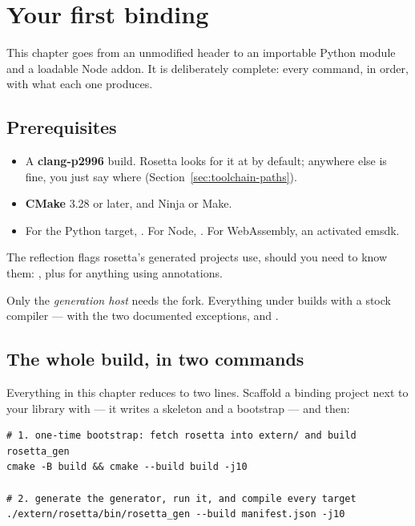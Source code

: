 \chapter{Your first binding}
\label{ch:first}

This chapter goes from an unmodified header to an importable Python module and
a loadable Node addon. It is deliberately complete: every command, in order,
with what each one produces.

\section{Prerequisites}

\begin{itemize}
  \item A \textbf{clang-p2996} build. Rosetta looks for it at
     by default; anywhere else
    is fine, you just say where (Section~\ref{sec:toolchain-paths}).
  \item \textbf{CMake} 3.28 or later, and Ninja or Make.
  \item For the Python target, . For Node,
    . For WebAssembly, an activated emsdk.
\end{itemize}

The reflection flags rosetta's generated projects use, should you need to know
them: , plus
 for anything using annotations.

\begin{note}
Only the \emph{generation host} needs the fork. Everything under
 builds with a stock compiler --- with the two documented
exceptions,  and .
\end{note}

\section{The whole build, in two commands}
\label{sec:twocommands}

Everything in this chapter reduces to two lines. Scaffold a binding project
next to your library with  --- it writes a
 skeleton and a bootstrap  --- and
then:

\begin{lstlisting}[style=sh]
# 1. one-time bootstrap: fetch rosetta into extern/ and build rosetta_gen
cmake -B build && cmake --build build -j10

# 2. generate the generator, run it, and compile every target
./extern/rosetta/bin/rosetta_gen --build manifest.json -j10
\end{lstlisting}

